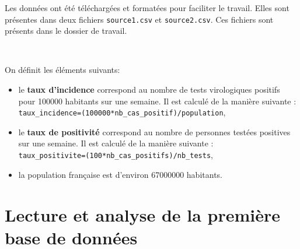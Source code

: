 Les données ont été téléchargées et formatées pour faciliter le travail. Elles sont présentes dans deux fichiers \verb?source1.csv? et \verb?source2.csv?. Ces fichiers sont présents dans le dossier de travail.

~\

On définit les éléments suivants:
\begin{itemize}
 \item le \textbf{taux d'incidence} correspond au nombre de tests virologiques positifs pour \num{100000} habitants sur une semaine. Il est calculé de la manière suivante : \\ \verb?taux_incidence=(100000*nb_cas_positif)/population?,
 \item le \textbf{taux de positivité} correspond au nombre de personnes testées positives sur une semaine. Il est calculé de la manière suivante : \\ \verb?taux_positivite=(100*nb_cas_positifs)/nb_tests?,
 \item la population française est d'environ \num{67000000} habitants.
\end{itemize}

\section*{Lecture et analyse de la première base de données}


